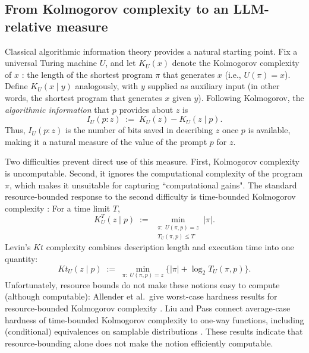 \documentclass[letterpaper]{article} %
\theoremstyle{definition}
\theoremstyle{remark}
\begin{document}
\subsection{From Kolmogorov complexity to an LLM-relative measure}
Classical algorithmic information theory provides a natural starting point.
Fix a universal Turing machine \(U\), and let \(K_U(x)\) denote the
Kolmogorov complexity of \(x\)
\cite{Solomonoff64,Kolmogorov65,Chaitin66}: the length of the shortest program
\(\pi\) that generates \(x\) (i.e., \(U(\pi)=x\)).  Define
\(K_U(x\mid y)\) analogously, with \(y\) supplied as auxiliary input (in other words, the shortest program that generates $x$ given $y$).
Following Kolmogorov, the \emph{algorithmic information}
\cite{ZL70,LiVitanyi} that \(p\) provides about \(z\) is
\begin{equation}\label{eq:classical}
I_U(p:z) \;:=\; K_U(z)-K_U(z\mid p).
\end{equation}
Thus, \(I_U(p:z)\) is the number of bits saved in describing \(z\) once \(p\)
is available, making it a natural measure of the value of the prompt \(p\) for
\(z\).

Two difficulties prevent direct use of this measure. First, Kolmogorov
complexity is uncomputable.
Second, it ignores the computational complexity of the program $\pi$, which makes it unsuitable for capturing ``computational gains".
The standard resource-bounded response to the second difficulty is time-bounded
Kolmogorov complexity \cite{Kolmogorov65,Ko86,Har83,Sipser83}: For a time limit $T$,
\begin{equation}
K^T_U(z \mid p) \;:=\; \min_{\substack{\pi:\; U(\pi,p)=z \\ T_U(\pi,p)\le T}} |\pi|.
\end{equation}
Levin's $Kt$ complexity \cite{Levin73} combines description length and
execution time into one quantity:
\begin{equation}
Kt_U(z \mid p) \;:=\; \min_{\pi:\; U(\pi,p)=z}
\bigl\{ |\pi| + \log_2 T_U(\pi,p) \bigr\}.
\end{equation}
Unfortunately, resource bounds do not make these notions easy to compute (although computable):
Allender et al.\ give worst-case hardness results for resource-bounded
Kolmogorov complexity \cite{ABKMR06}. Liu and Pass connect average-case
hardness of time-bounded Kolmogorov complexity to one-way functions, including
(conditional) equivalences on samplable distributions \cite{LP20,LP21,LP23}.
These results indicate that resource-bounding alone does not make the notion
efficiently computable.
\end{document}
